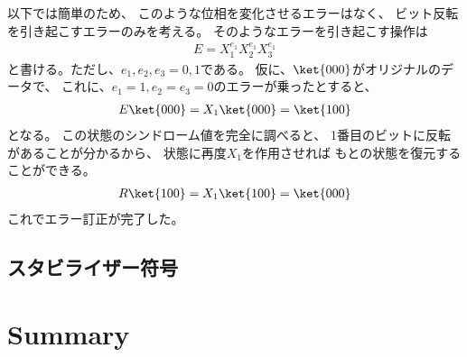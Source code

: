 \documentclass[]{ltjsarticle}
\begin{document}
以下では簡単のため、
このような位相を変化させるエラーはなく、
ビット反転を引き起こすエラーのみを考える。
そのようなエラーを引き起こす操作は
\begin{align}
    E = X_1^{e_1} X_2^{e_1} X_3^{e_1}
\end{align}
と書ける。ただし、$e_1,e_2,e_3 = 0,1$である。
仮に、$\ket{000}$がオリジナルのデータで、
これに、$e_1 = 1, e_2 = e_3 = 0$のエラーが乗ったとすると、
\begin{align}
    E\ket{000}
    =
    X_1\ket{000}
    =
    \ket{100}
\end{align}
となる。
この状態のシンドローム値を完全に調べると、
1番目のビットに反転があることが分かるから、
状態に再度$X_1$を作用させれば
もとの状態を復元することができる。
\begin{align}
    R\ket{100} = X_1\ket{100} = \ket{000}
\end{align}
これでエラー訂正が完了した。



\subsection{スタビライザー符号}




\section{Summary}


%
%
\end{document}
